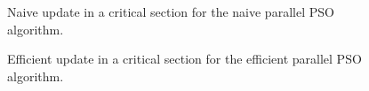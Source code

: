 \begin{figure}
  
  \caption{Naive update in a critical section for the naive parallel PSO
    algorithm.}
  \label{fig:naive-update}
\end{figure}

\begin{figure}
  
  \caption{Efficient update in a critical section for the efficient parallel PSO
    algorithm.}
  \label{fig:efficient-update}
\end{figure}

% 


